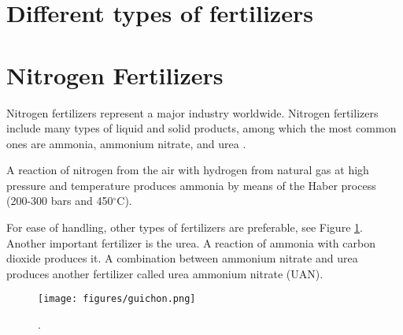 \documentclass[11pt,letterpaper]{article}
\begin{document}
\section{Different types of fertilizers}
\cite{hugh_savoy_fertilizers_2009}

\section{Nitrogen Fertilizers}
Nitrogen fertilizers represent a major industry worldwide. Nitrogen fertilizers include many types of liquid and solid products, among which the most common ones are ammonia, ammonium nitrate, and urea \cite{guichon_valves_nitrogen_2020}.

A reaction of nitrogen from the air with hydrogen from natural gas at high pressure and temperature produces ammonia by means of the Haber process (200-300 bars and 450$^{\circ}$C).

For ease of handling, other types of fertilizers are preferable, see Figure \ref{fig:nitrof}. Another important fertilizer is the urea. A reaction of ammonia with carbon dioxide produces it. A combination between ammonium nitrate and urea produces another fertilizer called urea ammonium nitrate (UAN).

\begin{figure}[] %
	\centering
	\texttt{[image: figures/guichon.png]}
	\hfill
	\caption{\cite{guichon_valves_nitrogen_2020}.}
	\label{fig:nitrof}
\end{figure}

\pagebreak


\end{document}
